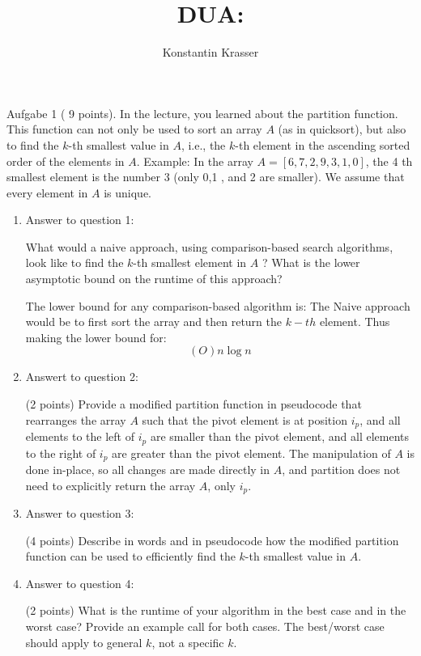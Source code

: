 \documentclass[11pt]{article}
\begin{document}
\author{Konstantin Krasser}
\title{DUA: }
\maketitle

\medskip

Aufgabe 1 ( 9 points). In the lecture, you learned about the partition function. This function can not only be used to sort an array \(A\) (as in quicksort), but also to find the \(k\)-th smallest value in \(A\), i.e., the \(k\)-th element in the ascending sorted order of the elements in \(A\).
Example: In the array \(A=[6,7,2,9,3,1,0]\), the 4 th smallest element is the number 3 (only 0,1 , and 2 are smaller). We assume that every element in \(A\) is unique.
\begin{enumerate}

	\item Answer to question 1:

	      What would a naive approach, using comparison-based search algorithms, look like to find the \(k\)-th smallest element in \(A\) ? What is the lower asymptotic bound on the runtime of this approach?

	      The lower bound for any comparison-based algorithm is: The Naive approach would be to first sort the array and then return the \(k-th\) element. Thus making the lower bound for:
	      \begin{equation}
		      (O) n \log n
	      \end{equation}

	\item Answert to question 2:

	      (2 points) Provide a modified partition function in pseudocode that rearranges the array \(A\) such that the pivot element is at position \(i_p\), and all elements to the left of \(i_p\) are smaller than the pivot element, and all elements to the right of \(i_p\) are greater than the pivot element. The manipulation of \(A\) is done in-place, so all changes are made directly in \(A\), and partition does not need to explicitly return the array \(A\), only \(i_p\).


	\item Answer to question 3:

	      (4 points) Describe in words and in pseudocode how the modified partition function can be used to efficiently find the \(k\)-th smallest value in \(A\).


	\item Answer to question 4:

	      (2 points) What is the runtime of your algorithm in the best case and in the worst case? Provide an example call for both cases. The best/worst case should apply to general \(k\), not a specific \(k\).

\end{enumerate}
\end{document}
